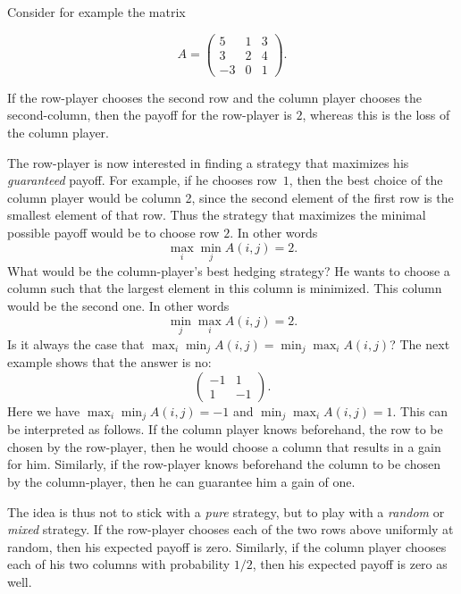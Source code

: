Consider for example the matrix 

\begin{equation}
  \label{eq:34}
  A =
  \begin{pmatrix}
    5 & 1 & 3 \\
    3 & 2 & 4 \\
    -3 & 0 &1 
  \end{pmatrix}. 
\end{equation}

If the row-player chooses the second row and the column player chooses
the second-column, then the payoff for the row-player is $2$, whereas
this is the loss of the column player.  

The row-player is now interested in finding a strategy that maximizes
his \emph{guaranteed} payoff. 
For example, if he chooses row~$1$, then the best choice of the column
player  would be column 2, since the second element of the first row
is the smallest element of that row. Thus the strategy that maximizes
the minimal possible payoff would be to choose row $2$. In other words
\begin{displaymath}
  \max_i \min_j A(i,j) = 2. 
\end{displaymath}
%
What would be the column-player's best hedging strategy? He wants to
choose a column such that the largest element in this column is
minimized. This column would be the second one. In other words
\begin{displaymath}
  \min_j \max_i A(i,j) = 2. 
\end{displaymath}
Is it always the case that $\max_i \min_j A(i,j) = \min_j \max_i
A(i,j)$? The next example shows that the answer is no: 
\begin{equation}
  \label{eq:36}
  \begin{pmatrix}
    -1 & 1 \\ 
    1 & -1
  \end{pmatrix}. 
\end{equation}
Here we have $ \max_i \min_j A(i,j) = -1$ and  $ \min_j \max_i A(i,j)
= 1$. This can be interpreted as follows. If the column player knows
beforehand, the row to be chosen by the row-player, then he would
choose a column that results in a gain for him.  Similarly, if the
row-player knows beforehand the column to be chosen by the
column-player, then he can guarantee him a gain of one. 

The idea is thus not to stick with a \emph{pure} strategy, but to play
with a \emph{random} or \emph{mixed} strategy. If the row-player
chooses each of the two rows above uniformly at random, then his
expected payoff is zero. Similarly, if the column player chooses each
of his two columns with probability $1/2$, then his expected payoff is
zero as well. 

